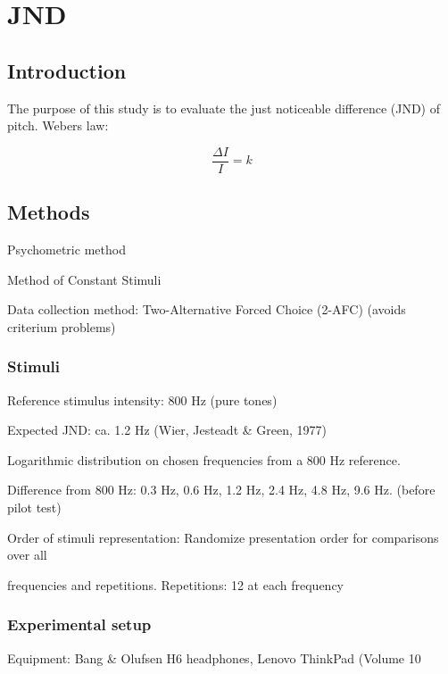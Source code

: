 \chapter*{JND}

\section*{Introduction}
The purpose of this study is to evaluate the just noticeable difference (JND) of pitch.
Webers law:

\begin{equation}
\frac{\Delta I}{I} = k
\end{equation}



\section*{Methods}
\begin{description}
\item Psychometric method
\item Method of Constant Stimuli
\item Data collection method: Two-Alternative Forced Choice (2-AFC) (avoids criterium problems)
\end{description}

\subsection*{Stimuli}
\begin{description}
\item Reference stimulus intensity: 800 Hz (pure tones)
\item Expected JND: ca. 1.2 Hz (Wier, Jesteadt \& Green, 1977)
\item Logarithmic distribution on chosen frequencies from a 800 Hz reference.
\item Difference from 800 Hz: 0.3 Hz, 0.6 Hz, 1.2 Hz, 2.4 Hz, 4.8 Hz, 9.6 Hz. (before pilot test)
\item Order of stimuli representation: Randomize presentation order for comparisons over all 
\item frequencies and repetitions.
Repetitions: 12 at each frequency 
\end{description}

\subsection*{Experimental setup}
Equipment: Bang \& Olufsen H6 headphones, Lenovo ThinkPad (Volume 10%

